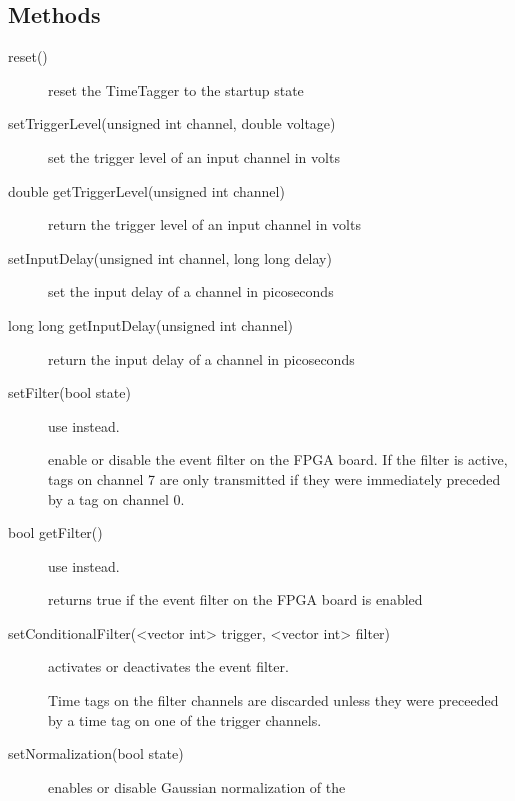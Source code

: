 \documentclass[letterpaper,10pt,english]{sphinxmanual}
\begin{document}
\subsection{Methods}
\label{sections/api:methods}\begin{description}
\item[{reset()}] \leavevmode
reset the TimeTagger to the startup state

\item[{setTriggerLevel(unsigned int channel, double voltage)}] \leavevmode
set the trigger level of an input channel in volts

\item[{double getTriggerLevel(unsigned int channel)}] \leavevmode
return the trigger level of an input channel in volts

\item[{setInputDelay(unsigned int channel, long long delay)}] \leavevmode
set the input delay of a channel in picoseconds

\item[{long long getInputDelay(unsigned int channel)}] \leavevmode
return the input delay of a channel in picoseconds

\item[{setFilter(bool state)}] \leavevmode
{}use  instead.

enable or disable the event filter on the FPGA board. If the filter
is active, tags on channel 7 are only transmitted if they were
immediately preceded by a tag on channel 0.

\item[{bool getFilter()}] \leavevmode
{}use  instead.

returns true if the event filter on the FPGA board is enabled

\item[{setConditionalFilter(\textless{}vector int\textgreater{} trigger, \textless{}vector int\textgreater{} filter)}] \leavevmode
{}activates or deactivates the event filter.

Time tags on the filter channels are discarded unless they were
preceeded by a time tag on one of the trigger channels.

\item[{setNormalization(bool state)}] \leavevmode
{}enables or disable Gaussian normalization of the


\end{description}
\end{document}
